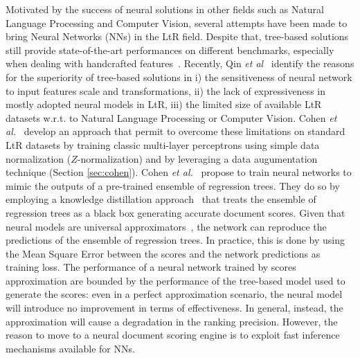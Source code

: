 Motivated by the success of neural solutions in other fields such as Natural Language Processing and Computer Vision, several attempts have been made to bring Neural Networks (NNs) in the LtR field. Despite that, tree-based solutions still provide state-of-the-art performances on different benchmarks, especially when dealing with handcrafted features~\cite{qin2020neural}. 
Recently, Qin \emph{et al}~\cite{qin2020neural} identify the reasons for the superiority of tree-based solutions in i) the sensitiveness of neural network to input features scale and transformations, ii) the lack of expressiveness in mostly adopted neural models in LtR, iii) the limited size of available LtR datasets w.r.t. to Natural Language Processing or Computer Vision. Cohen \textit{et al.}~\cite{cohen2018universal} develop an approach that permit to overcome these limitations on standard LtR datasets by training classic multi-layer perceptrons using simple data normalization ($Z$-normalization) and by leveraging a data augumentation technique (Section \ref{sec:cohen}). 
Cohen \textit{et al.}~\cite{cohen2018universal} propose to train neural networks to mimic the outputs of a pre-trained ensemble of regression trees. They do so by employing a knowledge distillation approach~\cite{ba2014deep,DBLP:journals/corr/HintonVD15} that treats the ensemble of regression trees as a black box generating accurate document scores.
Given that neural models are universal approximators~\cite{hornik1991approximation}, the network can reproduce the predictions of the ensemble of regression trees. In practice, this is done by using the Mean Square Error between the scores and the network predictions as training loss. The performance of a neural network trained by scores approximation are bounded by the performance of the tree-based model used to generate the scores: even in a perfect approximation scenario, the neural model will introduce no improvement in terms of effectiveness. In general, instead, the approximation will cause a degradation in the ranking precision. However, the reason to move to a neural document scoring engine is to exploit fast inference mechanisms available for NNs.
